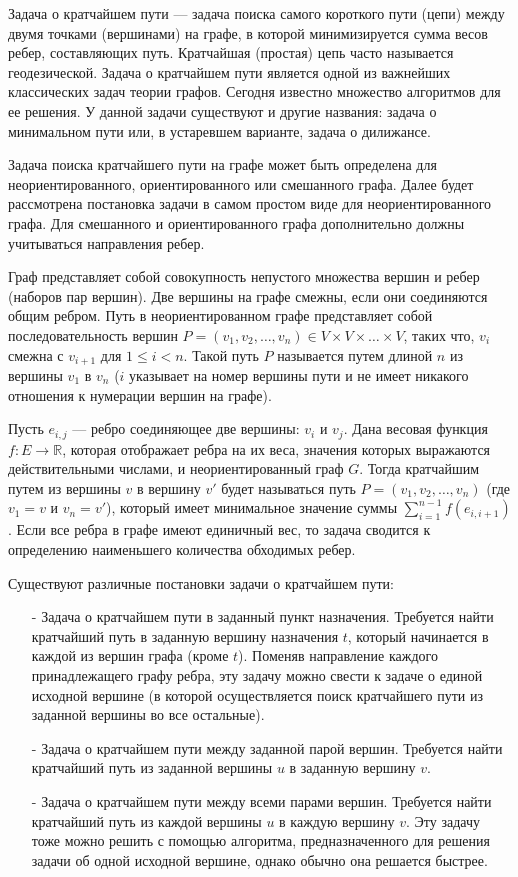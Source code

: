 Задача о кратчайшем пути --- задача поиска самого короткого пути (цепи) между двумя точками (вершинами) на графе, в которой минимизируется сумма весов ребер, составляющих путь.
Кратчайшая (простая) цепь часто называется геодезической. \cite{graph-harry}
Задача о кратчайшем пути является одной из важнейших классических задач теории графов. 
Сегодня известно множество алгоритмов для ее решения.
У данной задачи существуют и другие названия: задача о минимальном пути или, в устаревшем варианте, задача о дилижансе.

Задача поиска кратчайшего пути на графе может быть определена для неориентированного, ориентированного или смешанного графа. 
Далее будет рассмотрена постановка задачи в самом простом виде для неориентированного графа. 
Для смешанного и ориентированного графа дополнительно должны учитываться направления ребер.

Граф представляет собой совокупность непустого множества вершин и ребер (наборов пар вершин). 
Две вершины на графе смежны, если они соединяются общим ребром. 
Путь в неориентированном графе представляет собой последовательность вершин $P = (v_1, v_2, \dots, v_n) \in V\times V \times \dots \times V$, таких что, $v_i$ смежна с $v_{i+1}$ для $1\leqslant i < n$.
Такой путь $P$ называется путем длиной $n$ из вершины $v_1$ в $v_n$ ($i$ указывает на номер вершины пути и не имеет никакого отношения к нумерации вершин на графе).

Пусть $e_{i, j}$ --- ребро соединяющее две вершины: $v_i$ и $v_j$. 
Дана весовая функция $f: E \rightarrow \mathbb{R}$, которая отображает ребра на их веса, значения которых выражаются действительными числами, и неориентированный граф $G$. 
Тогда кратчайшим путем из вершины $v$ в вершину $v'$ будет называться путь $P = ( v_1, v_2, \ldots, v_n )$ (где $v_1 = v$ и $v_n = v'$), который имеет минимальное значение суммы $\sum_{i =1}^{n-1} f(e_{i, i+1})$. 
Если все ребра в графе имеют единичный вес, то задача сводится к определению наименьшего количества обходимых ребер. \cite{graph-evstigneev}

Существуют различные постановки задачи о кратчайшем пути:
\begin{itemize}
\item [-] Задача о кратчайшем пути в заданный пункт назначения. 
Требуется найти кратчайший путь в заданную вершину назначения $t$, который начинается в каждой из вершин графа (кроме $t$). 
Поменяв направление каждого принадлежащего графу ребра, эту задачу можно свести к задаче о единой исходной вершине (в которой осуществляется поиск кратчайшего пути из заданной вершины во все остальные).
\item [-] Задача о кратчайшем пути между заданной парой вершин. 
Требуется найти кратчайший путь из заданной вершины $u$ в заданную вершину $v$.
\item [-] Задача о кратчайшем пути между всеми парами вершин. 
Требуется найти кратчайший путь из каждой вершины $u$ в каждую вершину $v$. 
Эту задачу тоже можно решить с помощью алгоритма, предназначенного для решения задачи об одной исходной вершине, однако обычно она решается быстрее.
\end{itemize}

